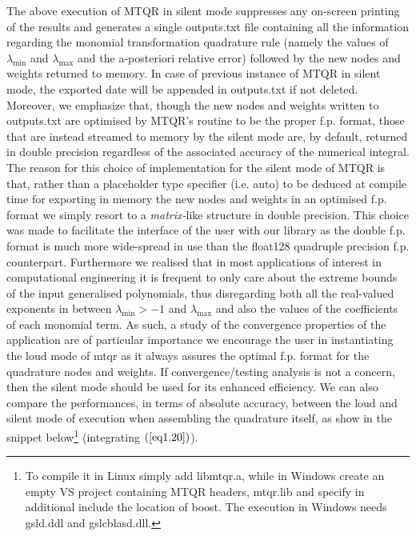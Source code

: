 \documentclass[a4paper, twosided]{book}
\begin{document}
\noindent
The above execution of MTQR in silent mode suppresses any on-screen printing of the results and generates a single \colorbox{poliGrayBlue}{outputs.txt} file containing all the information regarding the monomial transformation quadrature rule (namely the values of $\lambda_{\text{min}}$ and $\lambda_{\text{max}}$ and the a-posteriori relative error) followed by the new nodes and weights returned to memory. In case of previous instance of MTQR in silent mode, the exported date will be appended in  \colorbox{poliGrayBlue}{outputs.txt} if not deleted. Moreover, we emphasize that, though the new nodes and weights written to \colorbox{poliGrayBlue}{outputs.txt} are optimised by MTQR's routine to be the proper f.p. format, those that are instead streamed to memory by the silent mode are, by default, returned in \colorbox{poliGrayBlue}{double} precision regardless of the associated accuracy of the numerical integral. The reason for this choice of implementation for the silent mode of MTQR is that, rather than a placeholder type specifier (i.e. \colorbox{poliGrayBlue}{auto}) to be deduced at compile time for exporting in memory the new nodes and weights in an optimised f.p. format we simply resort to a {\itshape matrix-}like structure in \colorbox{poliGrayBlue}{double} precision. This choice was made to facilitate the interface of the user with our library as the \colorbox{poliGrayBlue}{double} f.p. format is much more wide-spread in use than the \colorbox{poliGrayBlue}{float128} quadruple precision f.p. counterpart. Furthermore we realised that in most applications of interest in computational engineering it is frequent to only care about the extreme bounds of the input generalised polynomials, thus disregarding both all the real-valued exponents in between $\lambda_{\text{min}}>-1$ and $\lambda_{\text{max}}$ and also the values of the coefficients of each monomial term. As such, a study of the convergence properties of the application are of particular importance we encourage the user in instantiating the loud mode of \colorbox{poliGrayBlue}{mtqr} as it always assures the optimal f.p. format for the quadrature nodes and weights. If convergence/testing analysis is not a concern, then the silent mode should be used for its enhanced efficiency. We can also compare the performances, in terms of absolute accuracy, between the loud and silent mode of execution when assembling the quadrature itself, as show in the snippet below\footnote{To compile it in Linux simply add \colorbox{poliGrayBlue}{libmtqr.a}, while in Windows create an empty VS project containing MTQR headers, \colorbox{poliGrayBlue}{mtqr.lib} and specify in additional include the location of \colorbox{poliGrayBlue}{boost}. The execution in Windows needs \colorbox{poliGrayBlue}{gsld.ddl} and \colorbox{poliGrayBlue}{gslcblasd.dll}.\vspace{-4ex}} (integrating $(\ref{eq1.20})$).
\end{document}
